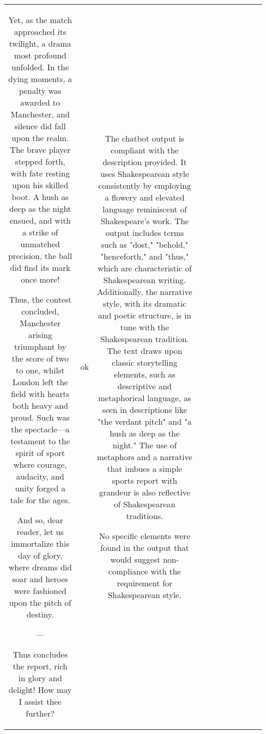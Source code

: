 \begin{table}[h!]
\begin{tabular}{|c|c|c|c|c|c|c|c|c|c|c|}
Yet, as the match approached its twilight, a drama most profound unfolded. In the dying moments, a penalty was awarded to Manchester, and silence did fall upon the realm. The brave player stepped forth, with fate resting upon his skilled boot. A hush as deep as the night ensued, and with a strike of unmatched precision, the ball did find its mark once more!

Thus, the contest concluded, Manchester arising triumphant by the score of two to one, whilst London left the field with hearts both heavy and proud. Such was the spectacle—a testament to the spirit of sport where courage, audacity, and unity forged a tale for the ages.

And so, dear reader, let us immortalize this day of glory, where dreams did soar and heroes were fashioned upon the pitch of destiny.

--- 

Thus concludes the report, rich in glory and delight! How may I assist thee further? & ok & The chatbot output is compliant with the description provided. It uses Shakespearean style consistently by employing a flowery and elevated language reminiscent of Shakespeare's work. The output includes terms such as "dost," "behold," "henceforth," and "thus," which are characteristic of Shakespearean writing. Additionally, the narrative style, with its dramatic and poetic structure, is in tune with the Shakespearean tradition. The text draws upon classic storytelling elements, such as descriptive and metaphorical language, as seen in descriptions like "the verdant pitch" and "a hush as deep as the night." The use of metaphors and a narrative that imbues a simple sports report with grandeur is also reflective of Shakespearean traditions.

No specific elements were found in the output that would suggest non-compliance with the requirement for Shakespearean style. 


\end{tabular}
\end{table}
